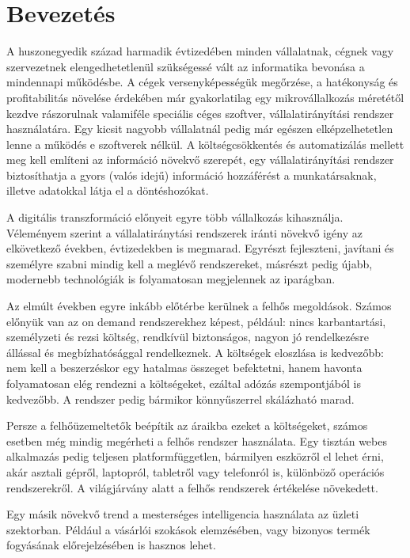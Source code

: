 \documentclass[12pt]{article}
\begin{document}
\section*{Bevezetés}

A huszonegyedik század harmadik évtizedében minden vállalatnak, cégnek vagy szervezetnek elengedhetetlenül szükségessé vált az informatika bevonása a mindennapi működésbe. A cégek versenyképességük megőrzése, a hatékonyság és profitabilitás növelése érdekében már gyakorlatilag egy mikrovállalkozás méretétől kezdve rászorulnak valamiféle speciális céges szoftver, vállalatirányítási rendszer használatára. Egy kicsit nagyobb vállalatnál pedig már egészen elképzelhetetlen lenne a működés e szoftverek nélkül. A költségcsökkentés és automatizálás mellett meg kell említeni az információ növekvő szerepét, egy vállalatirányítási rendszer biztosíthatja a gyors (valós idejű) információ hozzáférést a munkatársaknak, illetve adatokkal látja el a döntéshozókat.

A digitális transzformáció előnyeit egyre több vállalkozás kihasználja. Véleményem szerint a vállalatiránytási rendszerek iránti növekvő igény az elkövetkező években, évtizedekben is megmarad. Egyrészt fejleszteni, javítani és személyre szabni mindig kell a meglévő rendszereket, másrészt pedig újabb, modernebb technológiák is folyamatosan megjelennek az iparágban.

Az elmúlt években egyre inkább előtérbe kerülnek a felhős megoldások. Számos előnyük van az on demand rendszerekhez képest, például: nincs karbantartási, személyzeti és rezsi költség, rendkívül biztonságos, nagyon jó rendelkezésre állással és megbízhatósággal rendelkeznek. A költségek eloszlása is kedvezőbb: nem kell a beszerzéskor egy hatalmas összeget befektetni, hanem havonta folyamatosan elég rendezni a költségeket, ezáltal adózás szempontjából is kedvezőbb. A rendszer pedig bármikor könnyűszerrel skálázható marad.

Persze a felhőüzemeltetők beépítik az áraikba ezeket a költségeket, számos esetben még mindig megérheti a felhős rendszer használata. Egy tisztán webes alkalmazás pedig teljesen platformfüggetlen, bármilyen eszközről el lehet érni, akár asztali gépről, laptopról, tabletről vagy telefonról is, különböző operációs rendszerekről. A világjárvány alatt a felhős rendszerek értékelése növekedett.

Egy másik növekvő trend a mesterséges intelligencia használata az üzleti szektorban. Például a vásárlói szokások elemzésében, vagy bizonyos termék fogyásának előrejelzésében is hasznos lehet.
\end{document}
